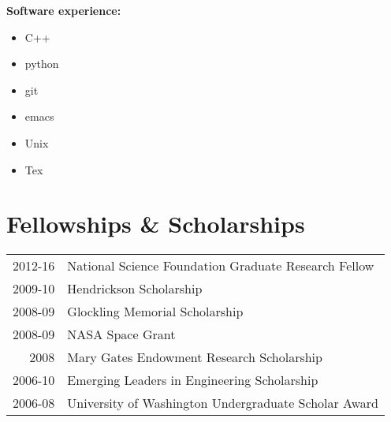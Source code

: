 \documentclass[a4paper,10pt]{article} %
\begin{document}
\textbf{Software experience:}
\begin{itemize}[noitemsep]
\item C++
\item python
\item git
\item emacs
\item Unix
\item Tex
\end{itemize}


\section{Fellowships \& Scholarships}

\begin{table}[H]
\begin{tabular}{rl}
\textsc{2012-16} & National Science Foundation Graduate Research Fellow\\
\textsc{2009-10} & Hendrickson Scholarship\\
\textsc{2008-09} & Glockling Memorial Scholarship\\
\textsc{2008-09} & NASA Space Grant\\
\textsc{2008} & Mary Gates Endowment Research Scholarship\\
\textsc{2006-10} & Emerging Leaders in Engineering Scholarship\\
\textsc{2006-08} & University of Washington Undergraduate Scholar Award\\
\end{tabular}
\end{table}

\FloatBarrier




\end{document}
